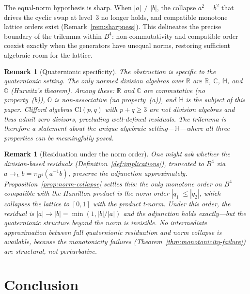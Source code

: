 \documentclass[11pt,a4paper]{article}
\newtheorem{remark}[theorem]{Remark}
\begin{document}
The equal-norm hypothesis is sharp. When $|a| \neq |b|$, the
collapse $a^2 = b^2$ that drives the cyclic swap at level~3 no
longer holds, and compatible monotone lattice orders exist
(Remark~\ref{rem:sharpness}). This delineates the precise
boundary of the trilemma within $B^4$: non-commutativity and
compatible order coexist exactly when the generators have unequal
norms, restoring sufficient algebraic room for the lattice.

\begin{remark}[Quaternionic specificity]
\label{rem:specificity}
The obstruction is specific to the quaternionic setting. The only
normed division algebras over $\mathbb{R}$ are $\mathbb{R}$,
$\mathbb{C}$, $\mathbb{H}$, and $\mathbb{O}$ (Hurwitz's theorem).
Among these: $\mathbb{R}$ and $\mathbb{C}$ are commutative
(no property~(b)), $\mathbb{O}$ is non-associative (no
property~(a)), and $\mathbb{H}$ is the subject of this paper.
Clifford algebras $\mathrm{Cl}(p,q)$ with $p + q \geq 3$ are not
division algebras and thus admit zero divisors, precluding
well-defined residuals. The trilemma is therefore a statement about
the \emph{unique} algebraic setting---$\mathbb{H}$---where all
three properties can be meaningfully posed.
\end{remark}

\begin{remark}[Residuation under the norm order]
\label{rem:residuation-norm}
One might ask whether the division-based residuals
(Definition~\ref{def:implications}), truncated to $B^4$ via
$a \to_L b = \pi_{B^4}(a^{-1} b)$, preserve the adjunction
approximately. Proposition~\ref{prop:norm-collapse} settles this:
the only monotone order on $B^4$ compatible with the Hamilton
product is the norm order $|q_1| \leq |q_2|$, which collapses the
lattice to $[0,1]$ with the product t-norm. Under this order, the
residual is $|a| \to |b| = \min(1, |b|/|a|)$ and the adjunction
holds \emph{exactly}---but the quaternionic structure beyond the
norm is invisible. No intermediate approximation between full
quaternionic residuation and norm collapse is available, because the
monotonicity failures (Theorem~\ref{thm:monotonicity-failure}) are
structural, not perturbative.
\end{remark}

\section{Conclusion}
\label{sec:conclusion}
\end{document}
